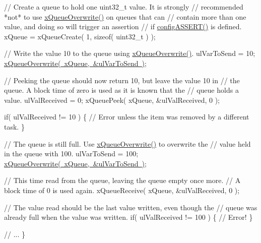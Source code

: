 \begin{DoxyPre}    // Create a queue to hold one uint32\_t value.  It is strongly
    // recommended *not* to use \mbox{\hyperlink{queue_8h_a8e9ced123b5a0e37a36d3bbdb2e56b4e}{xQueueOverwrite()}} on queues that can
    // contain more than one value, and doing so will trigger an assertion
    // if \mbox{\hyperlink{_free_r_t_o_s_8h_a228c70cd48927d6ab730ed1a6dfbe35f}{configASSERT()}} is defined.
    xQueue = xQueueCreate( 1, sizeof( uint32\_t ) );\end{DoxyPre}



\begin{DoxyPre}    // Write the value 10 to the queue using \mbox{\hyperlink{queue_8h_a8e9ced123b5a0e37a36d3bbdb2e56b4e}{xQueueOverwrite()}}.
    ulVarToSend = 10;
    \mbox{\hyperlink{queue_8h_a8e9ced123b5a0e37a36d3bbdb2e56b4e}{xQueueOverwrite( xQueue, \&ulVarToSend )}};\end{DoxyPre}



\begin{DoxyPre}    // Peeking the queue should now return 10, but leave the value 10 in
    // the queue.  A block time of zero is used as it is known that the
    // queue holds a value.
    ulValReceived = 0;
    xQueuePeek( xQueue, \&ulValReceived, 0 );\end{DoxyPre}



\begin{DoxyPre}    if( ulValReceived != 10 )
    \{
        // Error unless the item was removed by a different task.
    \}\end{DoxyPre}



\begin{DoxyPre}    // The queue is still full.  Use \mbox{\hyperlink{queue_8h_a8e9ced123b5a0e37a36d3bbdb2e56b4e}{xQueueOverwrite()}} to overwrite the
    // value held in the queue with 100.
    ulVarToSend = 100;
    \mbox{\hyperlink{queue_8h_a8e9ced123b5a0e37a36d3bbdb2e56b4e}{xQueueOverwrite( xQueue, \&ulVarToSend )}};\end{DoxyPre}



\begin{DoxyPre}    // This time read from the queue, leaving the queue empty once more.
    // A block time of 0 is used again.
    xQueueReceive( xQueue, \&ulValReceived, 0 );\end{DoxyPre}



\begin{DoxyPre}    // The value read should be the last value written, even though the
    // queue was already full when the value was written.
    if( ulValReceived != 100 )
    \{
        // Error!
    \}\end{DoxyPre}



\begin{DoxyPre}    // ...
\}
 \end{DoxyPre}
 
